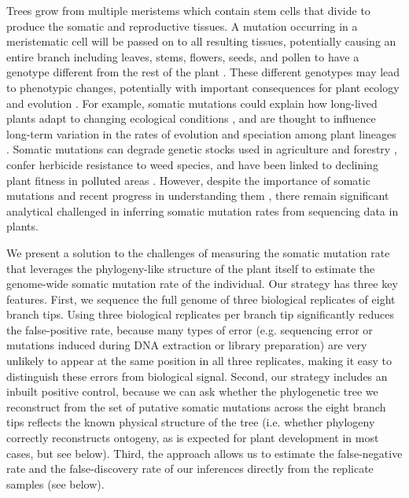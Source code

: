 Trees grow from multiple meristems which contain stem cells that divide to produce the somatic and reproductive tissues. A mutation occurring in a meristematic cell will be passed on to all resulting tissues, potentially causing an entire branch including leaves, stems, flowers, seeds, and pollen to have a genotype different from the rest of the plant \parencite{plomion_oak_2018, schmid-siegert_low_2017}. These different genotypes may lead to phenotypic changes, potentially with important consequences for plant ecology and evolution \parencite{whitham_evolution_1981, buss_evolution_1983, walbot_life_1985, sutherland_somatic_1986, klekowski_ageing_1989, ally_aging_2010}. For example, somatic mutations could explain how long-lived plants adapt to changing ecological conditions \parencite{gill_genetic_1995}, and are thought to influence long-term variation in the rates of evolution and speciation among plant lineages \parencite{lanfear_taller_2013}. Somatic mutations can degrade genetic stocks used in agriculture and forestry \parencite{khoury_trends_2010, schoen_deleterious_1998}, confer herbicide resistance to weed species, \parencite{michel_somatic_2004} and have been linked to declining plant fitness in polluted areas \parencite{klekowski_petroleum_1994}. However, despite the importance of somatic mutations and recent progress in understanding them \parencite{plomion_oak_2018, schmid-siegert_low_2017, hanlon_somatic_2019, wang_architecture_2019, schultz_mutation_2009, bobiwash_somatic_2013}, there remain significant analytical challenged in inferring somatic mutation rates from sequencing data in plants.

We present a solution to the challenges of measuring the somatic mutation rate that leverages the phylogeny-like structure of the plant itself to estimate the genome-wide somatic mutation rate of the individual. Our strategy has three key features. First, we sequence the full genome of three biological replicates of eight branch tips. Using three biological replicates per branch tip significantly reduces the false-positive rate, because many types of error (e.g. sequencing error or mutations induced during DNA extraction or library preparation) are very unlikely to appear at the same position in all three replicates, making it easy to distinguish these errors from biological signal. Second, our strategy includes an inbuilt positive control, because we can ask whether the phylogenetic tree we reconstruct from the set of putative somatic mutations across the eight branch tips reflects the known physical structure of the tree (i.e. whether phylogeny correctly reconstructs ontogeny, as is expected for plant development in most cases, but see below). Third, the approach allows us to estimate the false-negative rate and the false-discovery rate of our inferences directly from the replicate samples (see below).

